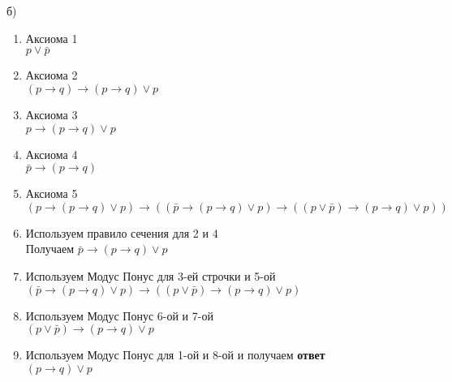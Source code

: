 \documentclass[a4paper, 12pt]{article} %
\begin{document}
б) \begin{enumerate}
    \item Аксиома 1
    \\ $p \vee \bar p$
    \item Аксиома 2 \\
    $(p \rightarrow q) \rightarrow (p \rightarrow q) \vee p$
    \item Аксиома 3 \\
    $p \rightarrow (p \rightarrow q) \vee p$
    \item Аксиома 4 \\
    $\bar p \rightarrow (p \rightarrow q)$
    \item Аксиома 5 \\
    $(p \rightarrow (p \rightarrow q) \vee p) \rightarrow 
    ((\bar p \rightarrow (p \rightarrow q) \vee p) \rightarrow((p \vee \bar p) 
    \rightarrow (p \rightarrow q) \vee p))$
    \item Используем правило сечения для 2 и 4 \\
    Получаем $\bar p \rightarrow (p \rightarrow q) \vee p$
    \item Используем Модус Понус для 3-ей строчки и 5-ой\\
    $(\bar p \rightarrow (p \rightarrow q) \vee p) \rightarrow((p \vee \bar p) 
    \rightarrow (p \rightarrow q) \vee p)$
    \item Используем Модус Понус 6-ой и 7-ой\\
     $(p \vee \bar p) 
    \rightarrow (p \rightarrow q) \vee p$
    \item Используем Модус Понус для 1-ой  и 8-ой и получаем \textbf{ответ}\\
    $(p \rightarrow q) \vee p$
\end{enumerate}
\end{document}
